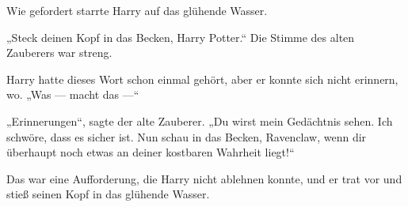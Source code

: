 Wie gefordert starrte Harry auf das glühende Wasser.

„Steck deinen Kopf in das Becken, Harry Potter.“
Die Stimme des alten Zauberers war streng.

Harry hatte dieses Wort schon einmal gehört, aber er konnte sich nicht erinnern, wo.
„Was — macht das —“

„Erinnerungen“, sagte der alte Zauberer.
„Du wirst mein Gedächtnis sehen. Ich schwöre, dass es sicher ist. Nun schau in das Becken, Ravenclaw, wenn dir überhaupt noch etwas an deiner kostbaren Wahrheit liegt!“

Das war eine Aufforderung, die Harry nicht ablehnen konnte, und er trat vor und stieß seinen Kopf in das glühende Wasser.

\later

